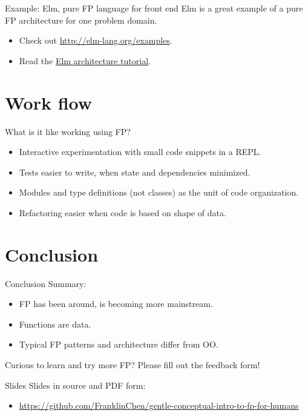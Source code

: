 \begin{frame}{Example: Elm, pure FP language for front end}
  Elm is a great example of a pure FP architecture for one problem
  domain.

  \begin{itemize}
  \item Check out \href{live Elm demo Web
      apps}{http://elm-lang.org/examples}.
  \item Read the \href{https://github.com/evancz/elm-architecture-tutorial/}{Elm
    architecture tutorial}.
  \end{itemize}
\end{frame}

\section{Work flow}

\begin{frame}{What is it like working using FP?}
  \begin{itemize}
  \item Interactive experimentation with small code snippets in a
    REPL.
  \item Tests easier to write, when state and dependencies minimized.
  \item Modules and type definitions (not classes) as the unit of code organization.
  \item Refactoring easier when code is based on shape of data.
  \end{itemize}
\end{frame}

\section{Conclusion}

\begin{frame}{Conclusion}
  Summary:
  \begin{itemize}
  \item FP has been around, is becoming more mainstream.
  \item Functions are data.
  \item Typical FP patterns and architecture differ from OO.
  \end{itemize}

  \begin{block}{Curious to learn and try more FP?}
    Please fill out the feedback form!
  \end{block}
\end{frame}

\begin{frame}{Slides}
  Slides in source and PDF form:
  \begin{itemize}
  \item \url{https://github.com/FranklinChen/gentle-conceptual-intro-to-fp-for-humans}
  \end{itemize}
\end{frame}


